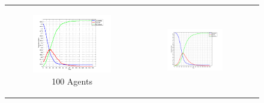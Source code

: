 \begin{figure}
\begin{center}

	\begin{tabular}{c c c}
		\begin{subfigure}[b]{0.3\textwidth}
			\centering
			\includegraphics[width=1\textwidth, angle=0]{./../shared/fig/frabs/SIR_100agents_150t_01dt_parallel_10replications.png}
			\caption{100 Agents}
			\label{fig:sir_abs_agents_repls_100}
		\end{subfigure}
    	&
		\begin{subfigure}[b]{0.3\textwidth}
			\centering
			\includegraphics[width=1\textwidth, angle=0]{./../shared/fig/frabs/SIR_1000agents_150t_01dt_parallel_10replications.png}

\end{subfigure}
\end{tabular}
\end{center}
\end{figure}
